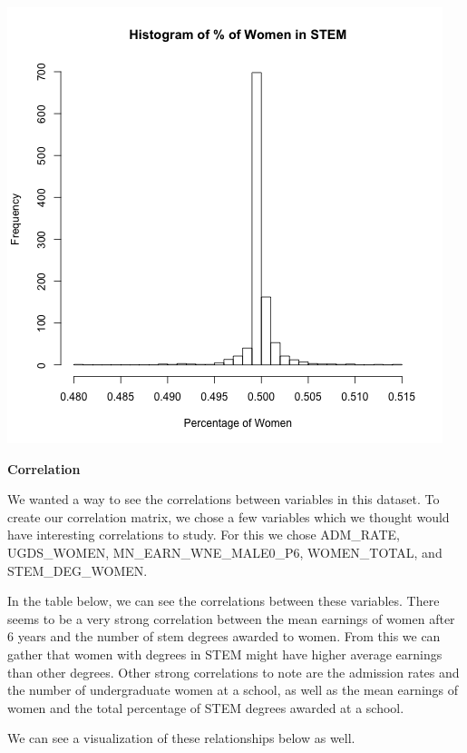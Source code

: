 \documentclass[11pt,english]{article}
\begin{document}
\noindent\includegraphics {../images/hist-stem-pcnt-women.png}

\textbf{Correlation}

We wanted a way to see the correlations between variables in this dataset. To create our correlation matrix, we chose a few variables which we thought would have interesting correlations to study. For this we chose ADM\_RATE, UGDS\_WOMEN, MN\_EARN\_WNE\_MALE0\_P6, WOMEN\_TOTAL, and STEM\_DEG\_WOMEN. 

In the table below, we can see the correlations between these variables. There seems to be a very strong correlation between the mean earnings of women after 6 years and the number of stem degrees awarded to women. From this we can gather that women with degrees in STEM might have higher average earnings than other degrees. Other strong correlations to note are the admission rates and the number of undergraduate women at a school, as well as the mean earnings of women and the total percentage of STEM degrees awarded at a school. 

We can see a visualization of these relationships below as well.
\end{document}
